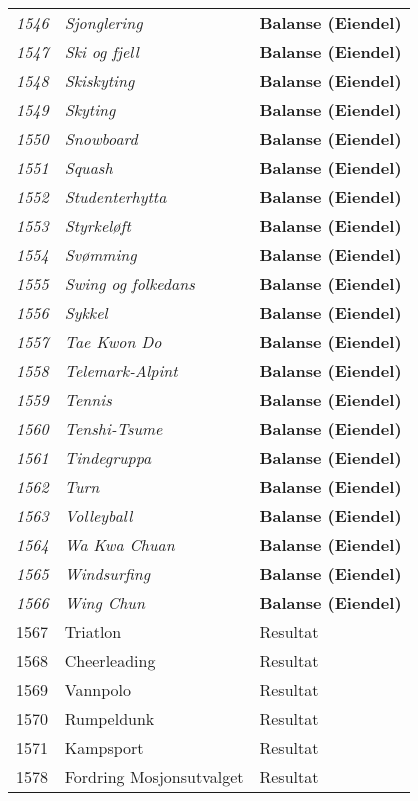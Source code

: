 \begin{longtable}{l l l}
\emph{1546} & \emph{Sjonglering} & {\bfseries Balanse (Eiendel)}\\
\emph{1547} & \emph{Ski og fjell} & {\bfseries Balanse (Eiendel)}\\
\emph{1548} & \emph{Skiskyting} & {\bfseries Balanse (Eiendel)}\\
\emph{1549} & \emph{Skyting} & {\bfseries Balanse (Eiendel)}\\
\emph{1550} & \emph{Snowboard} & {\bfseries Balanse (Eiendel)}\\
\emph{1551} & \emph{Squash} & {\bfseries Balanse (Eiendel)}\\
\emph{1552} & \emph{Studenterhytta} & {\bfseries Balanse (Eiendel)}\\
\emph{1553} & \emph{Styrkeløft} & {\bfseries Balanse (Eiendel)}\\
\emph{1554} & \emph{Svømming} & {\bfseries Balanse (Eiendel)}\\
\emph{1555} & \emph{Swing og folkedans} & {\bfseries Balanse (Eiendel)}\\
\emph{1556} & \emph{Sykkel} & {\bfseries Balanse (Eiendel)}\\
\emph{1557} & \emph{Tae Kwon Do} & {\bfseries Balanse (Eiendel)}\\
\emph{1558} & \emph{Telemark-Alpint} & {\bfseries Balanse (Eiendel)}\\
\emph{1559} & \emph{Tennis} & {\bfseries Balanse (Eiendel)}\\
\emph{1560} & \emph{Tenshi-Tsume} & {\bfseries Balanse (Eiendel)}\\
\emph{1561} & \emph{Tindegruppa} & {\bfseries Balanse (Eiendel)}\\
\emph{1562} & \emph{Turn} & {\bfseries Balanse (Eiendel)}\\
\emph{1563} & \emph{Volleyball} & {\bfseries Balanse (Eiendel)}\\
\emph{1564} & \emph{Wa Kwa Chuan} & {\bfseries Balanse (Eiendel)}\\
\emph{1565} & \emph{Windsurfing} & {\bfseries Balanse (Eiendel)}\\
\emph{1566} & \emph{Wing Chun} & {\bfseries Balanse (Eiendel)}\\
1567 & Triatlon & Resultat\\
1568 & Cheerleading & Resultat\\
1569 & Vannpolo & Resultat\\
1570 & Rumpeldunk & Resultat\\
1571 & Kampsport & Resultat\\
1578 & Fordring Mosjonsutvalget & Resultat\\

\end{longtable}
